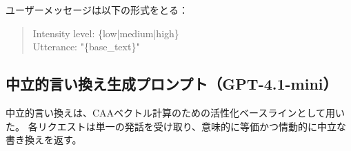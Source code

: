 \noindent ユーザーメッセージは以下の形式をとる：
\begin{quote}
\small\ttfamily
Intensity level: \{low|medium|high\}\\
Utterance: "\{base\_text\}"
\end{quote}

\subsection{中立的言い換え生成プロンプト（GPT-4.1-mini）}
\label{app:neutral_prompt}

中立的言い換えは、CAAベクトル計算のための活性化ベースラインとして用いた。
各リクエストは単一の発話を受け取り、意味的に等価かつ情動的に中立な書き換えを返す。

